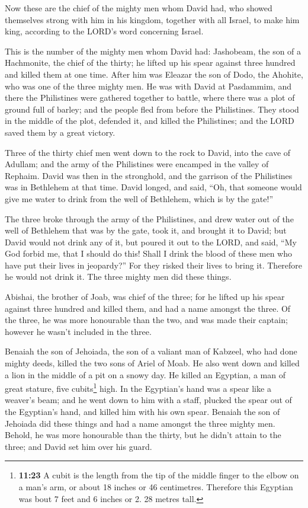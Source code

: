  Now these are the chief of the mighty men whom David
had, who showed themselves strong with him in his kingdom, together with
all Israel, to make him king, according to the LORD's word concerning
Israel.

 This is the number of the mighty men whom David had:
Jashobeam, the son of a Hachmonite, the chief of the thirty; he lifted
up his spear against three hundred and killed them at one time.
 After him was Eleazar the son of Dodo, the Ahohite, who
was one of the three mighty men.  He was with David at
Pasdammim, and there the Philistines were gathered together to battle,
where there was a plot of ground full of barley; and the people fled
from before the Philistines.  They stood in the middle of
the plot, defended it, and killed the Philistines; and the LORD saved
them by a great victory.

 Three of the thirty chief men went down to the rock to
David, into the cave of Adullam; and the army of the Philistines were
encamped in the valley of Rephaim.  David was then in the
stronghold, and the garrison of the Philistines was in Bethlehem at that
time.  David longed, and said, ``Oh, that someone would
give me water to drink from the well of Bethlehem, which is by the
gate!''

 The three broke through the army of the Philistines, and
drew water out of the well of Bethlehem that was by the gate, took it,
and brought it to David; but David would not drink any of it, but poured
it out to the LORD,  and said, ``My God forbid me, that I
should do this! Shall I drink the blood of these men who have put their
lives in jeopardy?'' For they risked their lives to bring it. Therefore
he would not drink it. The three mighty men did these things.

 Abishai, the brother of Joab, was chief of the three;
for he lifted up his spear against three hundred and killed them, and
had a name amongst the three.  Of the three, he was more
honourable than the two, and was made their captain; however he wasn't
included in the three.

 Benaiah the son of Jehoiada, the son of a valiant man of
Kabzeel, who had done mighty deeds, killed the two sons of Ariel of
Moab. He also went down and killed a lion in the middle of a pit on a
snowy day.  He killed an Egyptian, a man of great
stature, five cubits\footnote{\textbf{11:23} A cubit is the length from
  the tip of the middle finger to the elbow on a man's arm, or about 18
  inches or 46 centimetres. Therefore this Egyptian was bout 7 feet and
  6 inches or 2. 28 metres tall.} high. In the Egyptian's hand was a
spear like a weaver's beam; and he went down to him with a staff,
plucked the spear out of the Egyptian's hand, and killed him with his
own spear.  Benaiah the son of Jehoiada did these things
and had a name amongst the three mighty men.  Behold, he
was more honourable than the thirty, but he didn't attain to the three;
and David set him over his guard.

